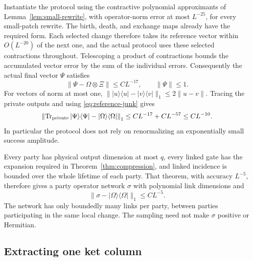 \documentclass[11pt]{article}
\numberwithin{equation}{section}
\theoremstyle{definition}
\theoremstyle{remark}
\begin{document}
Instantiate the protocol using the contractive polynomial approximants
of Lemma~\ref{lem:small-rewrite}, with operator-norm error at most
$L^{-25}$, for every small-patch rewrite.  The birth, death, and exchange
maps already have the required form.  Each selected change therefore takes
its reference vector within $O(L^{-20})$ of the next one, and the actual
protocol uses these selected contractions throughout.  Telescoping a
product of contractions bounds the accumulated vector error by the sum
of the individual errors. Consequently the actual final vector $\Psi$
satisfies
\[
 \lVert \Psi-\Omega\otimes\Xi\rVert\le CL^{-17},\qquad \lVert \Psi\rVert\le1.
\]
For vectors of norm at most one,
$\lVert |u\rangle\langle u|-|v\rangle\langle v|\rVert_1
\le2\lVert u-v\rVert$. Tracing the private outputs and using
\eqref{eq:reference-junk} gives
\begin{equation}\label{eq:protocol-density}
 \left\|\operatorname{Tr}_{\rm private}|\Psi\rangle\langle\Psi|
             -|\Omega\rangle\langle\Omega|\right\|_1
 \le CL^{-17}+CL^{-57}\le CL^{-10}.
\end{equation}
In particular the protocol does not rely on renormalizing an
exponentially small success amplitude.

Every party has physical output dimension at most $q$, every linked gate
has the expansion required in Theorem~\ref{thm:compression}, and linked
incidence is bounded over the whole lifetime of each party.
That theorem, with accuracy $L^{-5}$, therefore gives a party operator
network $\sigma$ with polynomial link dimensions and
\begin{equation}\label{eq:compressed-density}
 \lVert \sigma-|\Omega\rangle\langle\Omega|\rVert_1\le CL^{-5}.
\end{equation}
The network has only boundedly many links per party, between parties
participating in the same local change. The sampling need not make
$\sigma$ positive or Hermitian.

\subsection{Extracting one ket column}
\end{document}
